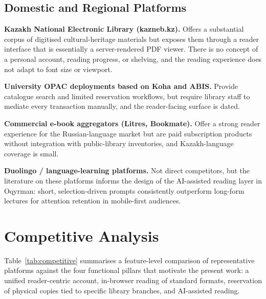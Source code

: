\documentclass[12pt,a4paper]{report}
\begin{document}
\subsection{Domestic and Regional Platforms}

\textbf{Kazakh National Electronic Library (kazneb.kz).} Offers a
substantial corpus of digitised cultural-heritage materials but exposes
them through a reader interface that is essentially a server-rendered PDF
viewer. There is no concept of a personal account, reading progress, or
shelving, and the reading experience does not adapt to font size or
viewport.

\textbf{University OPAC deployments based on Koha and ABIS.} Provide
catalogue search and limited reservation workflows, but require library
staff to mediate every transaction manually, and the reader-facing surface
is dated.

\textbf{Commercial e-book aggregators (Litres, Bookmate).} Offer a strong
reader experience for the Russian-language market but are paid
subscription products without integration with public-library inventories,
and Kazakh-language coverage is small.

\textbf{Duolingo / language-learning platforms.} Not direct competitors,
but the literature on these platforms \cite{vesselinov2012,licorish2018}
informs the design of the AI-assisted reading layer in Oqyrman: short,
selection-driven prompts consistently outperform long-form lectures for
attention retention in mobile-first audiences.

\section{Competitive Analysis}

Table~\ref{tab:competitive} summarises a feature-level comparison of
representative platforms against the four functional pillars that motivate
the present work: a unified reader-centric account, in-browser reading of
standard formats, reservation of physical copies tied to specific library
branches, and AI-assisted reading.
\end{document}
